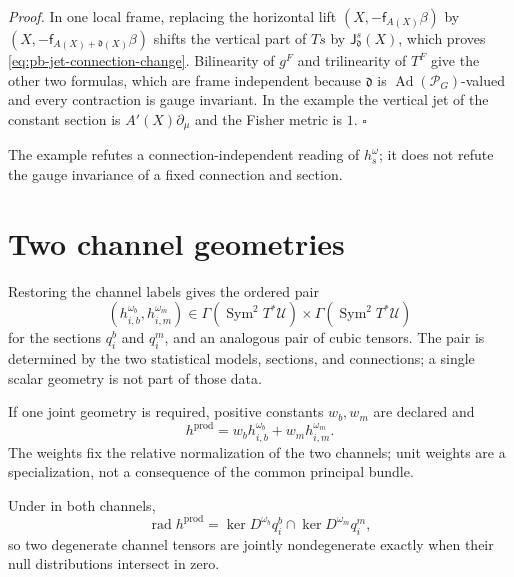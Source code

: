 \noindent\emph{Proof.}
In one local frame, replacing the horizontal lift \((X,-\mathsf f_{A(X)}\beta)\) by
\((X,-\mathsf f_{A(X)+\mathfrak d(X)}\beta)\) shifts the vertical part of \(Ts\) by
\(\mathsf J^s_{\mathfrak d}(X)\), which proves \eqref{eq:pb-jet-connection-change}. Bilinearity of
\(g^F\) and trilinearity of \(T^F\) give the other two formulas, which are frame independent because
\(\mathfrak d\) is \(\operatorname{Ad}(\mathscr P_G)\)-valued and every contraction is gauge
invariant. In the example the vertical jet of the constant section is \(A'(X)\partial_\mu\) and the
Fisher metric is \(1\). \hfill$\square$

The example refutes a connection-independent reading of \(h_s^\omega\); it does not refute the gauge
invariance of a fixed connection and section.

\section{Two channel geometries}
\label{sec:pb-two-channels}

Restoring the channel labels gives the ordered pair
\begin{equation}
(h_{i,b}^{\omega_b},h_{i,m}^{\omega_m})
\in\Gamma(\operatorname{Sym}^2T^*\mathcal U)
\times\Gamma(\operatorname{Sym}^2T^*\mathcal U)
\label{eq:pb-two-channel-pair}
\end{equation}
for the sections \(q_i^b\) and \(q_i^m\), and an analogous pair of cubic tensors. The pair is
determined by the two statistical models, sections, and connections; a single scalar geometry is not
part of those data.

If one joint geometry is required, positive constants \(w_b,w_m\) are declared and
\begin{equation}
h^{\mathrm{prod}}
=w_bh_{i,b}^{\omega_b}+w_mh_{i,m}^{\omega_m}.
\label{eq:pb-weighted-channel-pullback}
\end{equation}
The weights fix the relative normalization of the two channels; unit weights are a specialization,
not a consequence of the common principal bundle.

Under  in both channels,
\begin{equation}
\operatorname{rad}h^{\mathrm{prod}}
=\ker D^{\omega_b}q_i^b\cap\ker D^{\omega_m}q_i^m,
\label{eq:pb-product-radical}
\end{equation}
so two degenerate channel tensors are jointly nondegenerate exactly when their null distributions
intersect in zero. 

